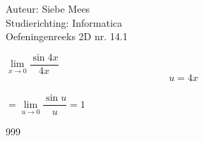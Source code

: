 \documentclass[a4paper]{article}
\begin{document}
  
\noindent \large Auteur: Siebe Mees \\
\noindent \large Studierichting: Informatica\\
\noindent \large Oefeningenreeks 2D nr. 14.1\\

\medskip

\normalsize

$\lim\limits_{x \rightarrow 0} \dfrac{\sin 4x}{4x} $\\ 

$$ u = 4x $$\\

$ = \lim\limits_{u \rightarrow 0} \dfrac{\sin u}{u} = 1$\\ 

\begin{thebibliography}{999}
\end{thebibliography}
\end{document}
